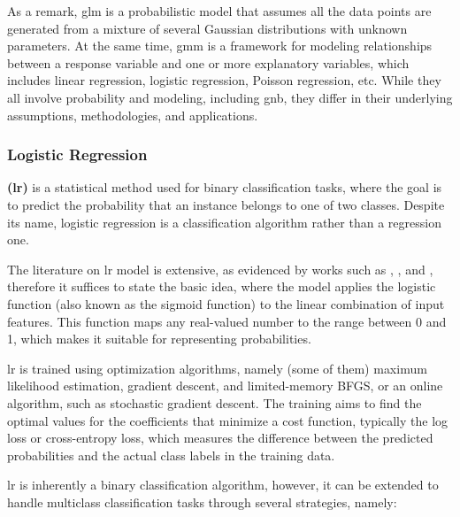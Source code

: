 As a remark, \gls{glm} is a probabilistic model that assumes all the data points are generated from a mixture of several Gaussian distributions with unknown parameters. At the same time,  \gls{gmm} is a framework for modeling relationships between a response variable and one or more explanatory variables, which includes linear regression, logistic regression, Poisson regression, etc. While they all involve probability and modeling, including \gls{gnb}, they differ in their underlying assumptions, methodologies, and applications.


\subsubsection{Logistic Regression}
\label{subsubsec:machine_learning_logistic_regrassion}

\textbf{ (\gls{lr})} is a statistical method used for binary classification tasks, where the goal is to predict the probability that an instance belongs to one of two classes. Despite its name, logistic regression is a classification algorithm rather than a regression one.

The literature on \gls{lr} model is extensive, as evidenced by works such as \cite{Mitchell1997}, \cite{Bouguila2020}, and \cite{Russel2010}, therefore it suffices to state the basic idea, where the model applies the logistic function (also known as the sigmoid function) to the linear combination of input features. This function maps any real-valued number to the range between 0 and 1, which makes it suitable for representing probabilities.

\gls{lr} is trained using optimization algorithms, namely (some of them) maximum likelihood estimation, gradient descent, and limited-memory BFGS, or an online algorithm, such as stochastic gradient descent. The training aims to find the optimal values for the coefficients that minimize a cost function, typically the log loss or cross-entropy loss, which measures the difference between the predicted probabilities and the actual class labels in the training data.

\gls{lr} is inherently a binary classification algorithm, however, it can be extended to handle multiclass classification tasks through several strategies, namely:

